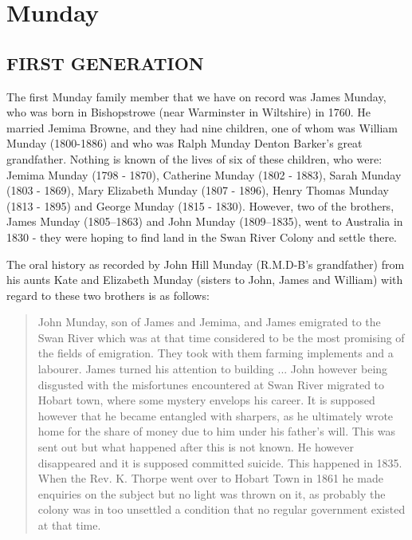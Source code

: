 \section{Munday}

\subsection{FIRST GENERATION}

The first Munday family member that we have on record was James Munday, who was born in Bishopstrowe (near Warminster in Wiltshire) in 1760.  He  married Jemima Browne, and they had nine children, one of whom was William Munday (1800-1886) and who was Ralph Munday Denton Barker's great grandfather. Nothing is known of the lives of six of these children, who were: Jemima Munday (1798 - 1870), Catherine Munday (1802 - 1883), Sarah Munday (1803 - 1869), Mary Elizabeth Munday (1807 - 1896), Henry Thomas Munday (1813 - 1895) and George Munday (1815 - 1830). However, two of the brothers, James Munday (1805--1863) and John Munday (1809--1835), went to Australia in 1830 - they were hoping  to find land in the Swan River Colony and settle there. 

The oral history as recorded by John Hill Munday (R.M.D-B's grandfather) from his aunts Kate and Elizabeth Munday (sisters to John, James and William) with regard to these two brothers is as follows: 

\begin{quotation}
John Munday, son of James and Jemima, and James emigrated to the Swan River which was at that time considered to be the most promising of the fields of emigration. They took with them farming implements and a labourer. James turned his attention to building ... John however being disgusted with the misfortunes encountered at Swan River migrated to Hobart town, where some mystery envelops his career. It is supposed however that he became entangled with sharpers, as he ultimately wrote home for the share of money due to him under his father's will. This was sent out but what happened after this is not known. He however disappeared and it is supposed committed suicide. This happened in 1835. When the Rev. K. Thorpe went over to Hobart Town in 1861 he made enquiries on the subject but no light was thrown on it, as probably the colony was in too unsettled a condition that no regular government existed at that time.
\end{quotation}


